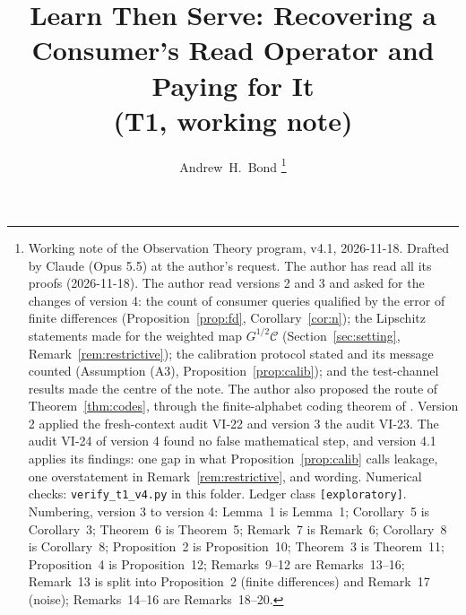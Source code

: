 \documentclass[11pt,onecolumn]{IEEEtran}
\begin{document}
\title{Learn Then Serve: Recovering a Consumer's Read Operator and Paying for It\\ (T1, working note)}
\author{Andrew~H.~Bond%
\thanks{Working note of the Observation Theory program, v4.1, 2026-11-18. Drafted by
Claude (Opus 5.5) at the author's request. The author has read all its proofs
(2026-11-18). The author read versions 2 and 3 and asked for the changes of version 4: the count of consumer queries qualified by the error of
finite differences (Proposition~\ref{prop:fd}, Corollary~\ref{cor:n}); the Lipschitz
statements made for the weighted map $G^{1/2}\mathcal C$ (Section~\ref{sec:setting},
Remark~\ref{rem:restrictive}); the calibration protocol stated and its message counted
(Assumption (A3), Proposition~\ref{prop:calib}); and the test-channel results made the
centre of the note. The author also proposed the route of Theorem~\ref{thm:codes},
through the finite-alphabet coding theorem of \cite[App.~A]{part1}. Version 2 applied the
fresh-context audit VI-22 and version 3 the audit VI-23. The audit VI-24 of version 4
found no false mathematical step, and version 4.1 applies its findings: one gap in
what Proposition~\ref{prop:calib} calls leakage, one overstatement in
Remark~\ref{rem:restrictive}, and wording. Numerical checks: \texttt{verify\_t1\_v4.py} in this folder. Ledger class
\texttt{[exploratory]}. Numbering, version 3 to version 4: Lemma~1 is Lemma~1;
Corollary~5 is Corollary~3; Theorem~6 is Theorem~5; Remark~7 is Remark~6; Corollary~8
is Corollary~8; Proposition~2 is Proposition~10; Theorem~3 is Theorem~11;
Proposition~4 is Proposition~12; Remarks~9--12 are Remarks~13--16; Remark~13 is split
into Proposition~2 (finite differences) and Remark~17 (noise); Remarks~14--16 are
Remarks~18--20.}}
\maketitle
\end{document}
